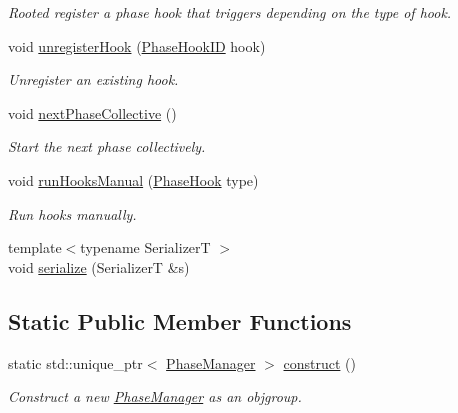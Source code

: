 \begin{DoxyCompactItemize}
\begin{DoxyCompactList}\small\item\em Rooted register a phase hook that triggers depending on the type of hook. \end{DoxyCompactList}\item 
void \hyperlink{structvt_1_1phase_1_1_phase_manager_a78334fd49c35f694f1e5fe5c560dc211}{unregister\+Hook} (\hyperlink{structvt_1_1phase_1_1_phase_hook_i_d}{Phase\+Hook\+ID} hook)
\begin{DoxyCompactList}\small\item\em Unregister an existing hook. \end{DoxyCompactList}\item 
void \hyperlink{structvt_1_1phase_1_1_phase_manager_ac94bfde4a103cbdec426542191c41092}{next\+Phase\+Collective} ()
\begin{DoxyCompactList}\small\item\em Start the next phase collectively. \end{DoxyCompactList}\item 
void \hyperlink{structvt_1_1phase_1_1_phase_manager_ae436f95e5eb570b17c71a48d96675f69}{run\+Hooks\+Manual} (\hyperlink{namespacevt_1_1phase_aec9a63fdd99680d7a7fe99d321193811}{Phase\+Hook} type)
\begin{DoxyCompactList}\small\item\em Run hooks manually. \end{DoxyCompactList}\item 
{\footnotesize template$<$typename SerializerT $>$ }\\void \hyperlink{structvt_1_1phase_1_1_phase_manager_a9cc247a2194bc858fa043a5fe5c9fb76}{serialize} (SerializerT \&s)
\end{DoxyCompactItemize}
\subsection*{Static Public Member Functions}
\begin{DoxyCompactItemize}
\item 
static std\+::unique\+\_\+ptr$<$ \hyperlink{structvt_1_1phase_1_1_phase_manager}{Phase\+Manager} $>$ \hyperlink{structvt_1_1phase_1_1_phase_manager_a6d864be02daa1cc0ec0b336aa1ebc31e}{construct} ()
\begin{DoxyCompactList}\small\item\em Construct a new {\ttfamily \hyperlink{structvt_1_1phase_1_1_phase_manager}{Phase\+Manager}} as an objgroup. \end{DoxyCompactList}\end{DoxyCompactItemize}
